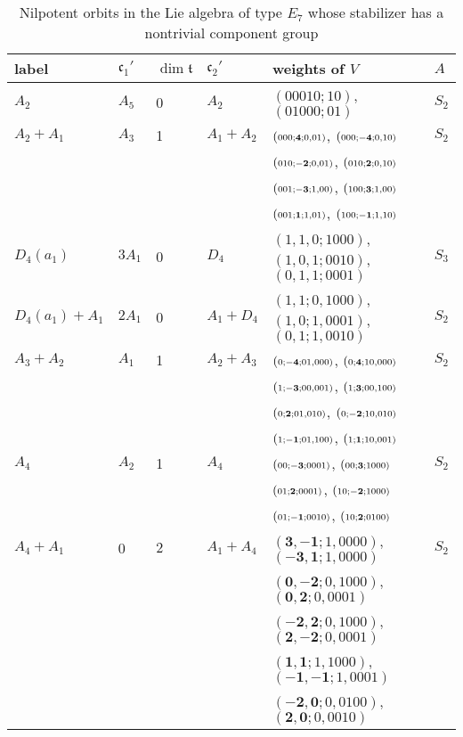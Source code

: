 \documentclass[a4paper,10pt]{amsart}
\newcommand{\mf}{\mathfrak}
\renewcommand{\c}{\mf{c}}
\newcommand{\wtt}[3]{{\small (\scriptstyle{#1};\scriptstyle{\mathbf{#2}};\scriptstyle{#3})}}
\newcommand{\wts}[2]{{({\scriptstyle{#1}};{\scriptstyle{#2}})}}
\newcommand{\ttt}{\mf{t}}
\numberwithin{equation}{section}
\theoremstyle{remark}
\theoremstyle{remark}
\begin{document}
\begin{longtable}{|l|l|l|l|l|l|}
\caption{Nilpotent orbits in the Lie algebra of type $E_7$ whose stabilizer
  has a nontrivial component group}\label{tab:E7} 
\endfirsthead
\hline
\endhead
\hline
\endfoot
\endlastfoot

\hline
label & $\c_1'$ & $\dim\ttt$ & $\c_2'$ & weights of $V$ & $A$\\
\hline
$A_2$ & $A_5$ & 0 & $A_2$ & $\wts{00010}{10}$, $\wts{01000}{01}$ & $S_2$\\
$A_2+A_1$ & $A_3$ & 1 & $A_1+A_2$ & $\wtt{000}{4}{0,01}$, $\wtt{000}{-4}{0,10}$ &
$S_2$\\
& & & & $\wtt{010}{-2}{0,01}$, $\wtt{010}{2}{0,10}$ & \\
& & & & $\wtt{001}{-3}{1,00}$, $\wtt{100}{3}{1,00}$ & \\
& & & & $\wtt{001}{1}{1,01}$, $\wtt{100}{-1}{1,10}$ & \\
$D_4(a_1)$ & $3A_1$ & 0 & $D_4$ & $\wts{1,1,0}{1000}$, $\wts{1,0,1}{0010}$,
$\wts{0,1,1}{0001}$ & $S_3$\\
$D_4(a_1)+A_1$ & $2A_1$ & 0 & $A_1+D_4$ & $\wts{1,1}{0,1000}$,
$\wts{1,0}{1,0001}$, $\wts{0,1}{1,0010}$ & $S_2$ \\
$A_3+A_2$ & $A_1$ & 1 &  $A_2+A_3$ & $\wtt{0}{-4}{01,000}$, $\wtt{0}{4}{10,000}$
& $S_2$\\
& & & & $\wtt{1}{-3}{00,001}$, $\wtt{1}{3}{00,100}$ & \\
& & & & $\wtt{0}{2}{01,010}$, $\wtt{0}{-2}{10,010}$ & \\
& & & & $\wtt{1}{-1}{01,100}$, $\wtt{1}{1}{10,001}$ & \\
$A_4$ & $A_2$ & 1 & $A_4$ & $\wtt{00}{-3}{0001}$, $\wtt{00}{3}{1000}$ & $S_2$\\
& & & & $\wtt{01}{2}{0001}$, $\wtt{10}{-2}{1000}$ & \\
& & & & $\wtt{01}{-1}{0010}$, $\wtt{10}{2}{0100}$ & \\
$A_4+A_1$ & 0 & $2$ & $A_1+A_4$ & $\wts{{\mathbf{3,-1}}}{1,0000}$,  $\wts{{\mathbf{-3,1}}}{1,0000}$ &  $S_2$\\
& & & &  $\wts{{\mathbf{0,-2}}}{0,1000}$,  $\wts{{\mathbf{0,2}}}{0,0001}$ &\\
& & & &  $\wts{{\mathbf{-2,2}}}{0,1000}$,  $\wts{{\mathbf{2,-2}}}{0,0001}$ &\\
& & & &  $\wts{{\mathbf{1,1}}}{1,1000}$,  $\wts{{\mathbf{-1,-1}}}{1,0001}$ &\\
& & & &  $\wts{{\mathbf{-2,0}}}{0,0100}$,  $\wts{{\mathbf{2,0}}}{0,0010}$ &\\

\end{longtable}
\end{document}
